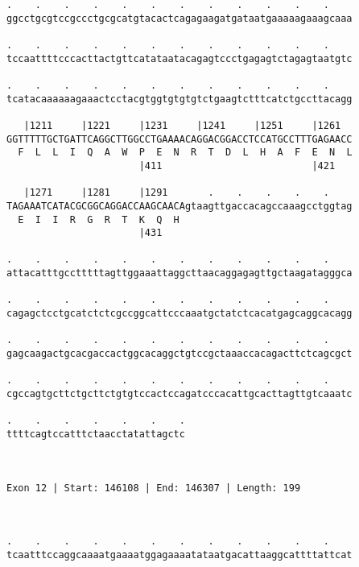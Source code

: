 \documentclass{article}
\begin{document}
\begin{Verbatim}
.    .    .    .    .    .    .    .    .    .    .    .    
ggcctgcgtccgccctgcgcatgtacactcagagaagatgataatgaaaaagaaagcaaa
                                                            
.    .    .    .    .    .    .    .    .    .    .    .    
tccaattttcccacttactgttcatataatacagagtccctgagagtctagagtaatgtc
                                                            
.    .    .    .    .    .    .    .    .    .    .    .    
tcatacaaaaaagaaactcctacgtggtgtgtgtctgaagtctttcatctgccttacagg
                                                            
   |1211     |1221     |1231     |1241     |1251     |1261  
GGTTTTTGCTGATTCAGGCTTGGCCTGAAAACAGGACGGACCTCCATGCCTTTGAGAACC
  F  L  L  I  Q  A  W  P  E  N  R  T  D  L  H  A  F  E  N  L
                       |411                          |421   
  
   |1271     |1281     |1291       .    .    .    .    .    
TAGAAATCATACGCGGCAGGACCAAGCAACAgtaagttgaccacagccaaagcctggtag
  E  I  I  R  G  R  T  K  Q  H                              
                       |431                                 
  
.    .    .    .    .    .    .    .    .    .    .    .    
attacatttgcctttttagttggaaattaggcttaacaggagagttgctaagatagggca
                                                            
.    .    .    .    .    .    .    .    .    .    .    .    
cagagctcctgcatctctcgccggcattcccaaatgctatctcacatgagcaggcacagg
                                                            
.    .    .    .    .    .    .    .    .    .    .    .    
gagcaagactgcacgaccactggcacaggctgtccgctaaaccacagacttctcagcgct
                                                            
.    .    .    .    .    .    .    .    .    .    .    .    
cgccagtgcttctgcttctgtgtccactccagatcccacattgcacttagttgtcaaatc
                                                            
.    .    .    .    .    .    .
ttttcagtccatttctaacctatattagctc
                               
                               
 
Exon 12 | Start: 146108 | End: 146307 | Length: 199



.    .    .    .    .    .    .    .    .    .    .    .    
tcaatttccaggcaaaatgaaaatggagaaaatataatgacattaaggcattttattcat
                                                            

\end{Verbatim}
\end{document}
